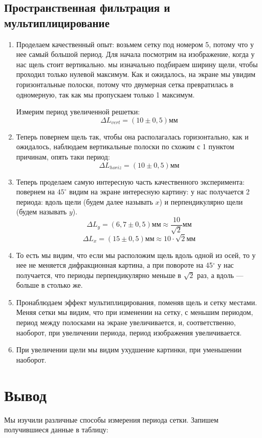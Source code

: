 \documentclass[a4paper, 12pt]{article}%
\begin{document}
\subsection{Пространственная фильтрация и мультиплицирование}
\begin{enumerate}
\item Проделаем качественный опыт: возьмем сетку под номером 5, потому что у нее самый большой период. Для начала посмотрим на изображение, когда у нас щель стоит вертикально. мы изначально подбираем ширину щели, чтобы проходил только нулевой максимум. Как и ожидалось, на экране мы увидим горизонтальные полоски, потому что двумерная сетка превратилась в одномерную, так как мы пропускаем только 1 максимум. 

Измерим период увеличенной решетки:
\[\Delta L_{vert} = (10 \pm 0,5) \text{мм}\]
\item Теперь повернем щель так, чтобы она располагалась горизонтально, как и ожидалось, наблюдаем вертикальные полоски по схожим с 1 пунктом причинам, опять таки период:
\[\Delta L_{horiz} = (10 \pm 0,5) \text{мм}\]
\item Теперь проделаем самую интересную часть качественного эксперимента: повернем на $45^{\circ}$ видим на экране интересную картину: у нас получается 2 периода: вдоль щели (будем далее называть $x$) и перпендикулярно щели (будем называть $y$).
\[\Delta L_y = (6,7 \pm 0,5) \text{мм} \approx \dfrac{10}{\sqrt{2}} \text{мм}\]
\[\Delta L_x = (15 \pm 0,5) \text{мм} \approx 10 \cdot \sqrt{2} \text{мм}\]
\item То есть мы видим, что если мы расположим щель вдоль одной из осей, то у нее не меняется дифракционная картина, а при повороте на 45$^{\circ}$ у нас получается, что периоды перпендикулярно меньше в $\sqrt{2}$ раз, а вдоль --- больше в столько же.


\item Пронаблюдаем эффект мультиплицирования, поменяв щель и сетку местами. Меняя сетки мы видим, что при изменении на сетку, с меньшим периодом, период между полосками на экране увеличивается, и, соответственно, наоборот, при увеличении периода, период изображения увеличивается.
\item При увеличении щели мы видим ухудшение картинки, при уменьшении наоборот. 
\end{enumerate}
\newpage
\section{Вывод}
Мы изучили различные способы измерения периода сетки. Запишем получившиеся данные в таблицу:
\end{document}

